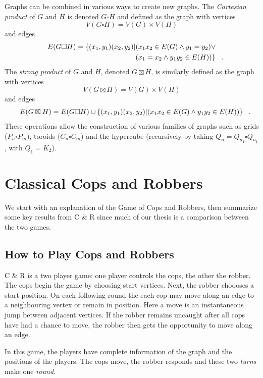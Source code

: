Graphs can be combined in various ways to create new graphs.
The \textit{Cartesian product} of $G$ and $H$ is denoted $G \square H$ and defined as the graph with vertices
\[ V(G \square H) = V(G) \times V(H) \]
and edges
\begin{align*}
  E(G \square H) = \{ (x_1,y_1)(x_2,y_2) | &(x_1x_2 \in E(G) \land y_1 = y_2) \lor \\
  & (x_1 = x_2 \land y_1y_2 \in E(H)) \} \mperiod
\end{align*}
The \textit{strong product} of $G$ and $H$, denoted $G \boxtimes H$, is similarly defined as the graph with vertices
\[ V(G \boxtimes H) = V(G) \times V(H) \]
and edges
\begin{align*}
  E(G \boxtimes H) = E(G \square H) \cup \{ (x_1,y_1)(x_2,y_2) | (x_1x_2 \in E(G) \land y_1y_2 \in E(H)) \} \mperiod
\end{align*}
These operations allow the construction of various families of graphs such as grids ($P_n \square P_m)$, toroids ($C_n \square C_m$) and the hypercube (recursively by taking $Q_n = Q_{n_1} \square Q_{n_1}$, with $Q_1 = K_2$).

\section{Classical Cops and Robbers}

We start with an explanation of the Game of Cops and Robbers, then summarize some key results from C \& R since much of our thesis is a comparison between the two games.

\subsection{How to Play Cops and Robbers}

C \& R is a two player game: one player controls the cops, the other the robber.
The cops begin the game by choosing start vertices. Next, the robber choooses a start position.
On each following round the each cop may move along an edge to a neighbouring vertex
or remain in position.
Here a move is an instantaneous jump between adjacent vertices.
If the robber remains uncaught after all cops have had a chance to move, the
robber then gets the opportunity to move along an edge.

In this game, the players have complete information of the graph and the positions of the players.
The cops move, the robber responds and these two \textit{turns} make one \textit{round}.

